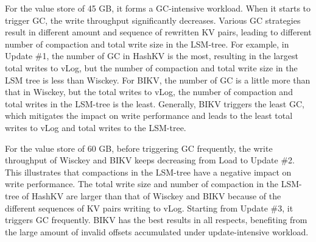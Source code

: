\documentclass[sigconf]{acmart}
\begin{document}
For the value store of 45 GB, it forms a GC-intensive workload. When it starts to trigger GC, the write throughput significantly decreases. Various GC strategies result in different amount and sequence of rewritten KV pairs, leading to different number of compaction and total write size in the LSM-tree. For example, in Update \#1, the number of GC in HashKV is the most, resulting in the largest total writes to vLog, but the number of compaction and total write size in the LSM tree is less than Wisckey. For BIKV, the number of GC is a little more than that in Wisckey, but the total writes to vLog, the number of compaction and total writes in the LSM-tree is the least. Generally, BIKV triggers the least GC, which mitigates the impact on write performance and leads to the least total writes to vLog and total writes to the LSM-tree.

For the value store of 60 GB, before triggering GC frequently, the write throughput of Wisckey and BIKV keeps decreasing from Load to Update \#2. This illustrates that compactions in the LSM-tree have a negative impact on write performance. The total write size and number of compaction in the LSM-tree of HashKV are larger than that of Wisckey and BIKV because of the different sequences of KV pairs writing to vLog. Starting from Update \#3, it triggers GC frequently. BIKV has the best results in all respects, benefiting from the large amount of invalid offsets accumulated under update-intensive workload.
\end{document}
